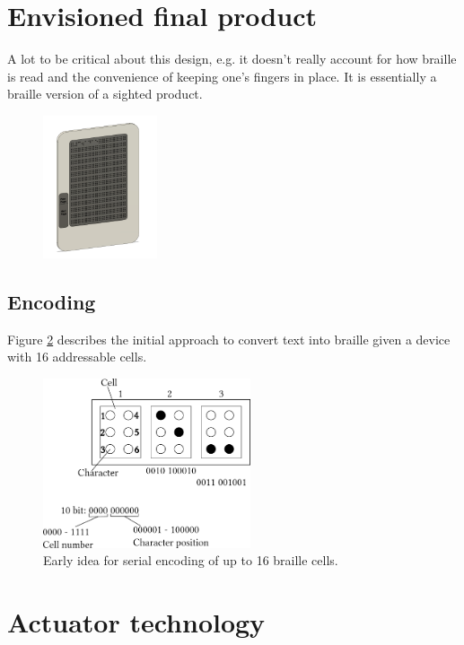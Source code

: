 \section{Envisioned final product}
A lot to be critical about this design, e.g. it doesn't really account for how braille is read and the convenience of keeping one's fingers in place. It is essentially a braille version of a sighted product.
\begin{figure}[h]
\centering
    \includegraphics[width=0.3\textwidth]{figures/e-reader.png}
\caption{}
\label{fig:e-reader.png}
\end{figure}

\subsection{Encoding}
Figure \ref{fig:encoding.png} describes the initial approach to convert text into braille given a device with 16 addressable cells.
\begin{figure}[h]
\centering
    \includegraphics[height=5cm]{figures/encoding.png}
\caption{Early idea for serial encoding of up to 16 braille cells.}
\label{fig:encoding.png}
\end{figure}

\section{Actuator technology}
